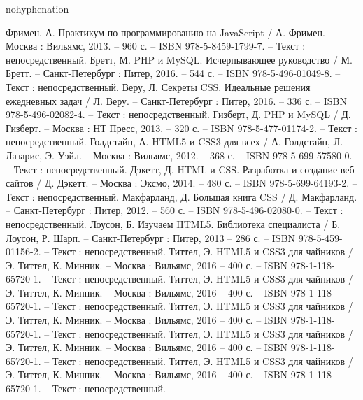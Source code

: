 \newsection
{}

\begin{hyphenrules}{nohyphenation} %
  \begin{thebibliography}{9}

     Фримен, А. Практикум по программированию на JavaScript / А. Фримен. – Москва : Вильямс, 2013. – 960 с. – ISBN 978-5-8459-1799-7. – Текст : непосредственный.
     Бретт, М. PHP и MySQL. Исчерпывающее руководство / М. Бретт. – Санкт-Петербург : Питер, 2016. – 544 с. – ISBN 978-5-496-01049-8. – Текст : непосредственный.
     Веру, Л. Секреты CSS. Идеальные решения ежедневных задач / Л. Веру. – Санкт-Петербург : Питер, 2016. – 336 с. – ISBN 978-5-496-02082-4. – Текст : непосредственный.
    	Гизберт, Д. PHP и MySQL / Д. Гизберт. – Москва : НТ Пресс, 2013. – 320 с. – ISBN 978-5-477-01174-2. – Текст : непосредственный.
		Голдстайн, А. HTML5 и CSS3 для всех / А. Голдстайн, Л. Лазарис, Э. Уэйл. – Москва : Вильямс, 2012. – 368 с. – ISBN 978-5-699-57580-0. – Текст : непосредственный.
		Дэкетт, Д. HTML и CSS. Разработка и создание веб-сайтов / Д. Дэкетт. – Москва : Эксмо, 2014. – 480 с. – ISBN 978-5-699-64193-2. – Текст : непосредственный.
		Макфарланд, Д. Большая книга CSS / Д. Макфарланд. – Санкт-Петербург : Питер, 2012. – 560 с. – ISBN 978-5-496-02080-0. – Текст : непосредственный.
		Лоусон, Б. Изучаем HTML5. Библиотека специалиста / Б. Лоусон, Р. Шарп. – Санкт-Петербург : Питер, 2013 – 286 с. – ISBN 978-5-459-01156-2. – Текст : непосредственный.
		Титтел, Э. HTML5 и CSS3 для чайников / Э. Титтел, К. Минник. – Москва : Вильямс, 2016 – 400 с. – ISBN 978-1-118-65720-1. – Текст : непосредственный.    
		Титтел, Э. HTML5 и CSS3 для чайников / Э. Титтел, К. Минник. – Москва : Вильямс, 2016 – 400 с. – ISBN 978-1-118-65720-1. – Текст : непосредственный.    
		Титтел, Э. HTML5 и CSS3 для чайников / Э. Титтел, К. Минник. – Москва : Вильямс, 2016 – 400 с. – ISBN 978-1-118-65720-1. – Текст : непосредственный.    
		Титтел, Э. HTML5 и CSS3 для чайников / Э. Титтел, К. Минник. – Москва : Вильямс, 2016 – 400 с. – ISBN 978-1-118-65720-1. – Текст : непосредственный.    
		Титтел, Э. HTML5 и CSS3 для чайников / Э. Титтел, К. Минник. – Москва : Вильямс, 2016 – 400 с. – ISBN 978-1-118-65720-1. – Текст : непосредственный.    
  \end{thebibliography}
\end{hyphenrules}
